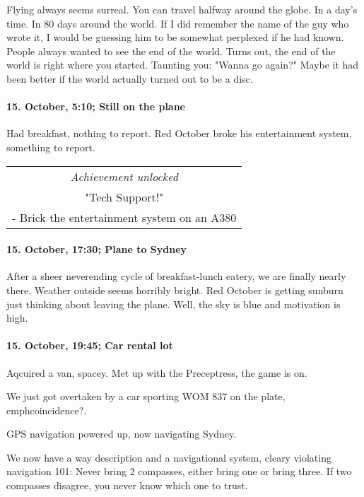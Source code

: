 Flying always seems surreal.
You can travel halfway around the globe.
In a day's time.
In 80 days around the world.
If I did remember the name of the guy who wrote it, I would be guessing him to be somewhat perplexed if he had known.
People always wanted to see the end of the world.
Turns out, the end of the world is right where you started.
Taunting you: "Wanna go again?"
Maybe it had been better if the world actually turned out to be a disc.

\paragraph{15. October, 5:10; Still on the plane}
Had breakfast, nothing to report.
Red October broke his entertainment system, something to report.

\begin{center}
\begin{tabular}{||c||}
\emph{Achievement unlocked}\\
"Tech Support!"\\
\multicolumn{1}{||p{0.8\textwidth}||}{\footnotesize - Brick the entertainment system on an A380} \\
\end{tabular}
\end{center}

\paragraph{15. October, 17:30; Plane to Sydney}
After a sheer neverending cycle of breakfast-lunch eatery, we are finally nearly there.
Weather outside seems horribly bright.
Red October is getting sunburn just thinking about leaving the plane.
Well, the sky is blue and motivation is high.

\paragraph{15. October, 19:45; Car rental lot}
Aqcuired a van, spacey.
Met up with the Preceptress, the game is on.

We just got overtaken by a car sporting WOM 837 on the plate, emph{coincidence}?.

GPS navigation powered up, now navigating Sydney.

We now have a way description and a navigational system, cleary violating navigation 101: Never bring 2 compasses, either bring one or bring three.
If two compasses disagree, you never know which one to trust.
